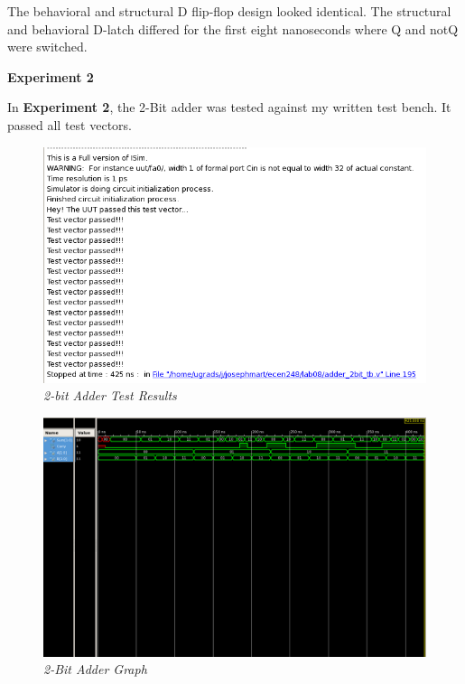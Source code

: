 \documentclass[a4paper,12pt]{article}
\begin{document}
  The behavioral and structural D flip-flop design looked identical. The
  structural and behavioral D-latch differed for the first eight nanoseconds
  where Q and notQ were switched.
  
  \textbf{Experiment 2}
  
  In \textbf{Experiment 2}, the 2-Bit adder was tested against my written
  test bench. It passed all test vectors.
  
  \begin{figure}[h]
    \begin{center}
      \includegraphics[scale=0.3]{adder2bit_tests.png}
      \caption{\textit{2-bit Adder Test Results}}
    \end{center}
  \end{figure}
  
  \newpage
  
  \begin{figure}[h]
    \begin{center}
      \includegraphics[scale=0.2]{adder2bit_graph.png}
      \caption{\textit{2-Bit Adder Graph}}
    \end{center}
  \end{figure}
  
\end{document}

